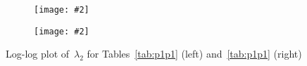 \documentclass[12pt]{article}
\newcommand{\includegraphicsw}[2][1.]{\texttt{[image: \#2]}}
\newcommand{\vect}[1]{\boldsymbol{\mathbf{#1}}}
\newcommand{\sphere}{{\Gamma_{\text{sph}}}}
\newcommand{\tor}{{\Gamma_{\text{tor}}}}
\begin{document}
\vfill
\begin{figure}[h]
	\centering\small
	\begin{subfigure}{.49\linewidth}
		\centering
		\includegraphicsw{sphere_2_P1P1.png}
	\end{subfigure}%
	\hfill
	\begin{subfigure}{.49\linewidth}
		\centering
		\includegraphicsw{torus_P1P1.png}
	\end{subfigure}
	\caption{Log-log plot of~$\lambda_2$ for Tables~\ref{tab:p1p1} (left) and~\ref{tab:p1p1} (right)}
\end{figure}
\vfill

\clearpage

\clearpage
\end{document}
